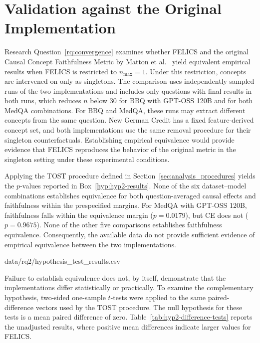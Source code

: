 \section{Validation against the Original Implementation}
\label{sec:results-original-validation}
Research Question~\ref{rq:convergence} examines whether FELICS and the original Causal Concept Faithfulness Metric by Matton et al.~\cite{mattonWalkTalkMeasuring2024} yield equivalent empirical results when FELICS is restricted to $n_{\max}=1$. Under this restriction, concepts are intervened on only as singletons. The comparison uses independently sampled runs of the two implementations and includes only questions with final results in both runs, which reduces $n$ below 30 for BBQ with GPT-OSS 120B and for both MedQA combinations. For BBQ and MedQA, these runs may extract different concepts from the same question. New German Credit has a fixed feature-derived concept set, and both implementations use the same removal procedure for their singleton counterfactuals. Establishing empirical equivalence would provide evidence that FELICS reproduces the behavior of the original metric in the singleton setting under these experimental conditions.

Applying the TOST procedure defined in Section~\ref{sec:analysis_procedures} yields the $p$-values reported in Box~\ref{hyp:hyp2-results}. None of the six dataset--model combinations establishes equivalence for both question-averaged causal effects and faithfulness within the prespecified margins. For MedQA with GPT-OSS 120B, faithfulness falls within the equivalence margin ($p=0.0179$), but CE does not ($p=0.9675$). None of the other five comparisons establishes faithfulness equivalence. Consequently, the available data do not provide sufficient evidence of empirical equivalence between the two implementations.

  {data/rq2/hypothesis_test_results.csv}

Failure to establish equivalence does not, by itself, demonstrate that the implementations differ statistically or practically. To examine the complementary hypothesis, two-sided one-sample $t$-tests were applied to the same paired-difference vectors used by the TOST procedure. The null hypothesis for these tests is a mean paired difference of zero. Table~\ref{tab:hyp2-difference-tests} reports the unadjusted results, where positive mean differences indicate larger values for FELICS.

